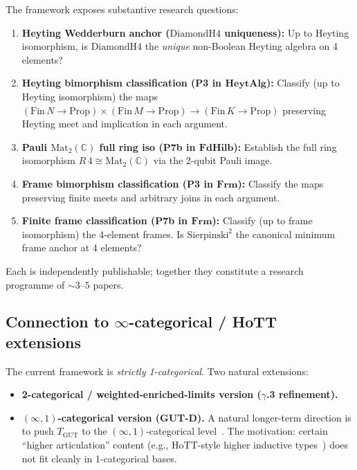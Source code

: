 \documentclass[11pt,a4paper]{article}
\theoremstyle{plain}
\theoremstyle{definition}
\theoremstyle{remark}
\newcommand{\C}{\mathbb{C}}
\newcommand{\cat}[1]{\mathbf{#1}}
\newcommand{\HeytAlg}{\cat{HeytAlg}}
\newcommand{\FdHilb}{\cat{FdHilb}}
\newcommand{\Frm}{\cat{Frm}}
\newcommand{\Mat}{\mathrm{Mat}}
\newcommand{\TGUT}{T_{\mathrm{GUT}}}
\newcommand{\DiamondH}{\mathrm{DiamondH4}}
\newcommand{\Sierp}{\mathrm{Sierpinski}}
\begin{document}
The framework exposes substantive research questions:

\begin{enumerate}[leftmargin=*]
\item \textbf{Heyting Wedderburn anchor ($\DiamondH$ uniqueness):} Up to Heyting isomorphism, is $\DiamondH$ the \emph{unique} non-Boolean Heyting algebra on 4 elements?

\item \textbf{Heyting bimorphism classification (P3 in $\HeytAlg$):} Classify (up to Heyting isomorphism) the maps $(\mathrm{Fin}\,N \to \mathrm{Prop}) \times (\mathrm{Fin}\,M \to \mathrm{Prop}) \to (\mathrm{Fin}\,K \to \mathrm{Prop})$ preserving Heyting meet and implication in each argument.

\item \textbf{Pauli $\Mat_2(\C)$ full ring iso (P7b in $\FdHilb$):} Establish the full ring isomorphism $R\,4 \cong \Mat_2(\C)$ via the 2-qubit Pauli image.

\item \textbf{Frame bimorphism classification (P3 in $\Frm$):} Classify the maps preserving finite meets and arbitrary joins in each argument.

\item \textbf{Finite frame classification (P7b in $\Frm$):} Classify (up to frame isomorphism) the 4-element frames. Is $\Sierp^2$ the canonical minimum frame anchor at 4 elements?
\end{enumerate}

Each is independently publishable; together they constitute a research programme of ${\sim}3$--$5$ papers.

\subsection{Connection to $\infty$-categorical / HoTT extensions}\label{sec:concl:infty}

The current framework is \emph{strictly 1-categorical}. Two natural extensions:

\begin{itemize}[leftmargin=*]
\item \textbf{2-categorical / weighted-enriched-limits version ($\gamma$.3 refinement).}
\item \textbf{$(\infty, 1)$-categorical version (GUT-D).} A natural longer-term direction is to push $\TGUT$ to the $(\infty, 1)$-categorical level~\cite{Ber19,Lur09}. The motivation: certain ``higher articulation'' content (e.g., HoTT-style higher inductive types~\cite{UF13}) does not fit cleanly in 1-categorical bases.
\end{itemize}
\end{document}
